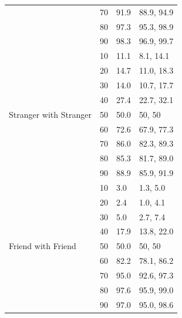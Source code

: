 \documentclass[10pt,letterpaper]{article}
\begin{document}
\begin{table}[ht]
\begin{center}
\begin{tabular}{ | m{2.75cm} | m{2.75cm} | m{2.75cm} | m{2.75cm} |}
& 70 & 91.9 & 88.9, 94.9 \\
& 80 & 97.3 & 95.3, 98.9 \\
& 90 & 98.3 & 96.9, 99.7 \\
\hline
\multirow{9}{2em}{Stranger with Stranger} & 10 & 11.1 & 8.1, 14.1 \\
& 20 & 14.7 & 11.0, 18.3 \\
& 30 & 14.0 & 10.7, 17.7 \\
& 40 & 27.4 & 22.7, 32.1 \\
& 50 & 50.0 & 50, 50 \\
& 60 & 72.6 & 67.9, 77.3 \\
& 70 & 86.0 & 82.3, 89.3 \\
& 80 & 85.3 & 81.7, 89.0 \\
& 90 & 88.9 & 85.9, 91.9 \\
\hline
\multirow{9}{2em}{Friend with Friend} & 10 & 3.0 & 1.3, 5.0 \\
& 20 & 2.4 & 1.0, 4.1 \\
& 30 & 5.0 & 2.7, 7.4 \\
& 40 & 17.9 & 13.8, 22.0 \\
& 50 & 50.0 & 50, 50 \\
& 60 & 82.2 & 78.1, 86.2 \\
& 70 & 95.0 & 92.6, 97.3 \\
& 80 & 97.6 & 95.9, 99.0 \\
& 90 & 97.0 & 95.0, 98.6 \\
\hline
\end{tabular}
\end{center}
\end{table}
\end{document}
